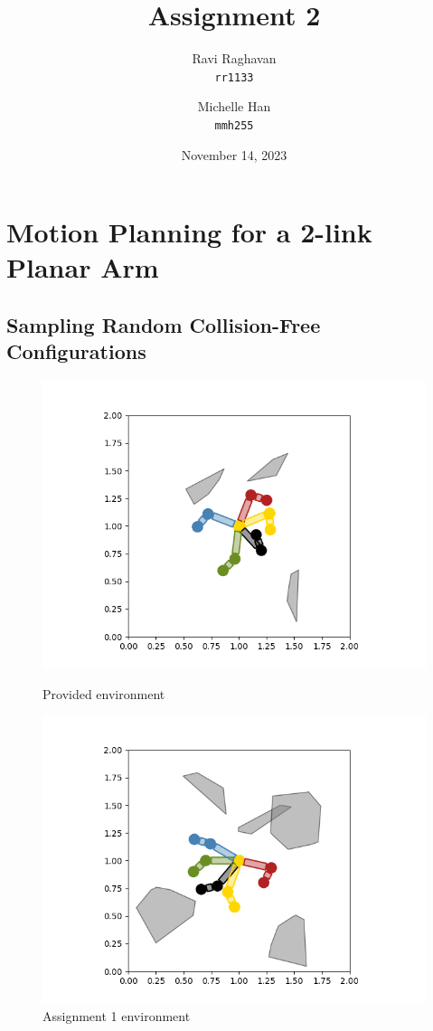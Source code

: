 \documentclass{article}
\title{Assignment 2}
\date{November 14, 2023}
\author{
  Ravi Raghavan\\
  \texttt{rr1133}
  \and
  Michelle Han\\
  \texttt{mmh255}
}
\begin{document}
\maketitle
\section{Motion Planning for a 2-link Planar Arm}
\subsection{Sampling Random Collision-Free Configurations}
\begin{figure}[h!]
     \begin{minipage}{0.48\textwidth}
    \includegraphics[width=\linewidth]{p1.1.1.png}
    \caption{Provided environment}
  \end{minipage}\hfill
  \begin{minipage}{0.48\textwidth}
    \includegraphics[width=\linewidth]{p1.1.2.png}
    \caption{Assignment 1 environment}
  \end{minipage}\hfill
\end{figure}
\end{document}
